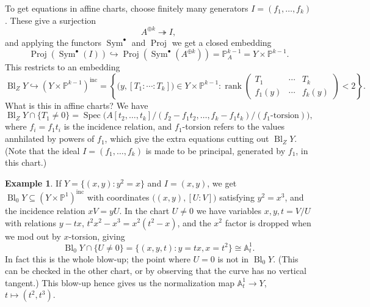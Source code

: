 \documentclass{article}
\theoremstyle{definition}
\newtheorem*{example}{Example}
\DeclareMathOperator{\Spec}{Spec}
\DeclareMathOperator{\Proj}{Proj}
\DeclareMathOperator{\rank}{rank}
\DeclareMathOperator{\Sym}{Sym}
\DeclareMathOperator{\Bl}{Bl}
\newcommand{\inc}{\mathrm{inc}}
\renewcommand{\P}{\mathbb{P}}
\newcommand{\A}{\mathbb{A}}
\begin{document}
To get equations in affine charts, choose finitely many generators
$I=(f_1,\ldots,f_k)$. These give a surjection
\begin{equation*}
    A^{\oplus k}\twoheadrightarrow I,
\end{equation*}
and applying the functors $\Sym^\bullet$ and $\Proj$ we get a closed embedding
\begin{equation*}
    \Proj(\Sym^\bullet(I)) \hookrightarrow \Proj(\Sym^\bullet(A^{\oplus k}))
        = \P^{k-1}_A = Y\times\P^{k-1}.
\end{equation*}
This restricts to an embedding
\begin{equation*}
    \Bl_ZY
        \hookrightarrow (Y\times\P^{k-1})^\inc
        = \left\{\bigl(y,[T_1:\cdots:T_k]\bigr)\in Y\times\P^{k-1}
                :\rank\begin{pmatrix}
                    T_1 & \cdots & T_k \\ f_1(y) & \cdots & f_k(y)
                \end{pmatrix}<2\right\}.
\end{equation*}
What is this in affine charts? We have
\begin{equation*}
    \Bl_ZY \cap \{T_1\ne0\}
        = \Spec\biggl(A[t_2,\ldots,t_k]
            /(f_2-f_1t_2,\ldots,f_k-f_1t_k)
            /(\text{$f_1$-torsion})\biggr),
\end{equation*}
where $f_i=f_1t_i$ is the incidence relation, and $f_1$-torsion refers to the
values annhilated by powers of $f_1$, which give the extra equations cutting out
$\Bl_ZY$. (Note that the ideal $I=(f_1,\ldots,f_k)$ is made to be principal,
generated by $f_1$, in this chart.)

\begin{example}
    If $Y=\{(x,y):y^2=x\}$ and $I=(x,y)$, we get
    $\Bl_0Y\subseteq(Y\times\P^1)^\inc$ with coordinates
    $\bigl((x,y),[U:V]\bigr)$ satisfying $y^2=x^3$, and the incidence relation
    $xV=yU$. In the chart $U\ne0$ we have variables $x,y,t=V/U$ with relations
    $y-tx$, $t^2x^2-x^3=x^2(t^2-x)$, and the $x^2$ factor is dropped when we mod
    out by $x$-torsion, giving
    \begin{equation*}
        \Bl_0Y\cap\{U\ne0\} = \{(x,y,t):y=tx,x=t^2\} \cong \A^1_t.
    \end{equation*}
    In fact this is the whole blow-up; the point where $U=0$ is not in $\Bl_0Y$.
    (This can be checked in the other chart, or by observing that the curve has
    no vertical tangent.) This blow-up hence gives us the normalization map
    $\A^1_t\to Y$, $t\mapsto(t^2,t^3)$.
\end{example}
\end{document}
